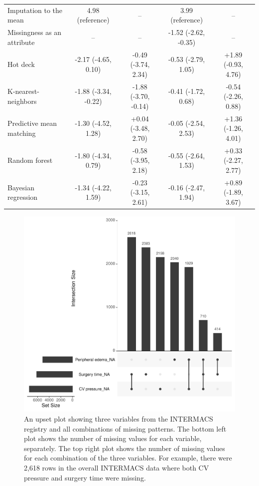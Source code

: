 \documentclass{article}
\begin{document}
\begin{table}
\begin{tabular}{lcccc}
\midrule
Imputation to the mean & 4.98 (reference) & -- & 3.99 (reference) & -- \\ 
Missingness as an attribute & -- & -- & -1.52 (-2.62, -0.35) & -- \\ 
Hot deck & -2.17 (-4.65, 0.10) & -0.49 (-3.74, 2.34) & -0.53 (-2.79, 1.05) & +1.89 (-0.93, 4.76) \\ 
K-nearest-neighbors & -1.88 (-3.34, -0.22) & -1.88 (-3.70, -0.14) & -0.41 (-1.72, 0.68) & -0.54 (-2.26, 0.88) \\ 
Predictive mean matching & -1.30 (-4.52, 1.28) & +0.04 (-3.48, 2.70) & -0.05 (-2.54, 2.53) & +1.36 (-1.26, 4.01) \\ 
Random forest & -1.80 (-4.34, 0.79) & -0.58 (-3.95, 2.18) & -0.55 (-2.64, 1.53) & +0.33 (-2.27, 2.77) \\ 
Bayesian regression & -1.34 (-4.22, 1.59) & -0.23 (-3.15, 2.61) & -0.16 (-2.47, 1.94) & +0.89 (-1.89, 3.67) \\ 
\bottomrule
\end{tabular} 
 \end{table}

\clearpage

\begin{figure}

{\centering \includegraphics{doc_arxiv_files/figure-latex/upset-1} 

}

\caption{An upset plot showing three variables from the INTERMACS registry and all combinations of missing patterns. The bottom left plot shows the number of missing values for each variable, separately. The top right plot shows the number of missing values for each combination of the three variables. For example, there were 2,618 rows in the overall INTERMACS data where both CV pressure and surgery time were missing.}\label{fig:upset}
\end{figure}
\end{document}
